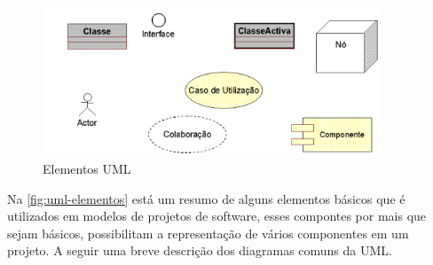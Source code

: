    \begin{figure}[H]
              \caption{\label{fig:uml-elementos}{Elementos UML}}
              \centering
              \includegraphics[width=0.9\textwidth]{Figuras/uml1.PNG}
        \end{figure}
    \par
    Na \autoref{fig:uml-elementos} está um resumo de alguns elementos básicos que é utilizados em modelos de projetos de software, esses compontes por mais que sejam básicos, possibilitam a representação de vários componentes em um projeto. A seguir uma breve descrição dos diagramas comuns da UML.
    
